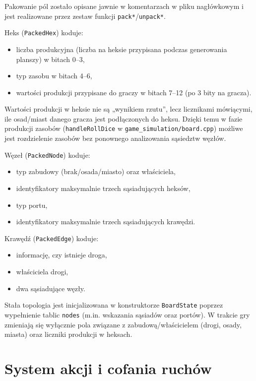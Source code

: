 \documentclass[polish,inz,longabstract]{iithesis}
\begin{document}
Pakowanie pól zostało opisane jawnie w komentarzach w pliku nagłówkowym i jest realizowane przez zestaw funkcji \texttt{pack*}/\texttt{unpack*}.

Heks (\texttt{PackedHex}) koduje:

\begin{itemize}
\item liczba produkcyjna (liczba na heksie przypisana podczas generowania planszy) w bitach 0–3,
\item typ zasobu w bitach 4–6,
\item wartości produkcji przypisane do graczy w bitach 7–12 (po 3 bity na gracza).
\end{itemize}

Wartości produkcji w heksie nie są „wynikiem rzutu”, lecz licznikami mówiącymi, ile osad/miast danego gracza jest podłączonych do heksu. Dzięki temu w fazie produkcji zasobów (\texttt{handleRollDice} w \texttt{game\_simulation/board.cpp}) możliwe jest rozdzielenie zasobów bez ponownego analizowania sąsiedztw węzłów.

Węzeł (\texttt{PackedNode}) koduje:

\begin{itemize}
\item typ zabudowy (brak/osada/miasto) oraz właściciela,
\item identyfikatory maksymalnie trzech sąsiadujących heksów,
\item typ portu,
\item identyfikatory maksymalnie trzech sąsiadujących krawędzi.
\end{itemize}

Krawędź (\texttt{PackedEdge}) koduje:

\begin{itemize}
\item informację, czy istnieje droga,
\item właściciela drogi,
\item dwa sąsiadujące węzły.
\end{itemize}

Stała topologia jest inicjalizowana w konstruktorze \texttt{BoardState} poprzez wypełnienie tablic \texttt{nodes} (m.in. wskazania sąsiadów oraz portów). W trakcie gry zmieniają się wyłącznie pola związane z zabudową/właścicielem (drogi, osady, miasta) oraz liczniki produkcji w heksach.


\section{System akcji i cofania ruchów}
\end{document}

